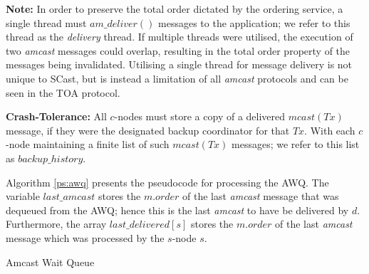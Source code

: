 \begin{enumerate}
        \textbf{Note:} In order to preserve the total order dictated by the ordering service, a single thread must $am\_deliver()$ messages to the application; we refer to this thread as the \emph{delivery} thread.  If multiple threads were utilised, the execution of two \emph{amcast} messages could overlap, resulting in the total order property of the messages being invalidated.  Utilising a single thread for message delivery is not unique to \textsf{SCast}, but is instead a limitation of all \emph{amcast} protocols and can be seen in the TOA protocol.    
        
        \textbf{Crash-Tolerance:} All $c$-nodes must store a copy of a delivered $mcast(Tx)$ message, if they were the designated backup coordinator for that $Tx$.  With each $c$-node maintaining a finite list of such $mcast(Tx)$ messages; we refer to this list as $backup\_history$.  
        \endleftbar

        Algorithm \ref{ps:awq} presents the pseudocode for processing the AWQ.  The variable $last\_amcast$ stores the $m.order$ of the last \emph{amcast} message that was dequeued from the AWQ; hence this is the last \emph{amcast} to have be delivered by $d$.  Furthermore, the array $last\_delivered[s]$ stores the $m.order$ of the last \emph{amcast} message which was processed by the $s$-node $s$.  
    
    \end{enumerate}
    \begin{algorithm}[H]
       \caption{Amcast Wait Queue}
        \label{ps:awq}
        \begin{algorithmic}[1]	        
	                
	                \ENDIF
	            \ENDIF
	            \ENDIF
	        \ENDWHILE
        \end{algorithmic}
    \end{algorithm}   
